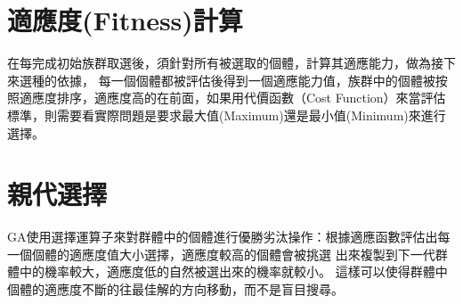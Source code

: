 \section{適應度(Fitness)計算}

在每完成初始族群取選後，須針對所有被選取的個體，計算其適應能力，做為接下來選種的依據， 每一個個體都被評估後得到一個適應能力值，族群中的個體被按照適應度排序，適應度高的在前面，如果用代價函數（Cost Function）來當評估標準，則需要看實際問題是要求最大值(Maximum)還是最小值(Minimum)來進行選擇。

\section{親代選擇}
GA使用選擇運算子來對群體中的個體進行優勝劣汰操作：根據適應函數評估出每一個個體的適應度值大小選擇，適應度較高的個體會被挑選 出來複製到下一代群體中的機率較大，適應度低的自然被選出來的機率就較小。 這樣可以使得群體中個體的適應度不斷的往最佳解的方向移動，而不是盲目搜尋。

